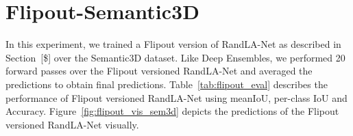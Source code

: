     \section{Flipout-Semantic3D}
    In this experiment, we trained a Flipout version of RandLA-Net as described in Section~[\$] over the Semantic3D dataset.
    Like Deep Ensembles, we performed 20 forward passes over the Flipout versioned RandLA-Net and averaged the predictions to obtain final predictions.
    Table~\ref{tab:flipout_eval} describes the performance of Flipout versioned RandLA-Net using meanIoU, per-class IoU and Accuracy.
    Figure~\ref{fig:flipout_vis_sem3d} depicts the predictions of the Flipout versioned RandLA-Net visually.
    \begin{table}[h!]
        \caption{Illustration of performance of Flipout versioned RandLA-Net on Semantic3D. meanIOU and IOU per-class and overall accuracy are represented here.
        C1 to C8 are the classes of Semantic3D which are Manmadeterrain, Naturalterrain, Highvegetation, Lowvegetation, Buildings, Hardscapes, Scanningartifacts, and Cars.}
        \label{tab:flipout_eval}
    \end{table}
